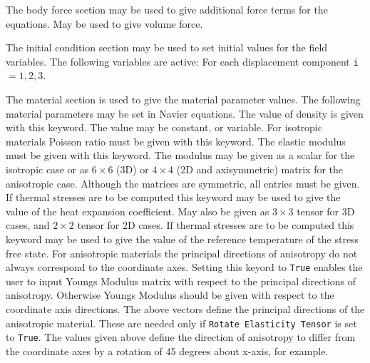 The body force section may be used to give additional force terms for the equations.
\sifbegin
{} May be used to give volume force.
\sifend

The initial condition section may be used to set initial values for the field
variables. The following variables are active:
\sifbegin
{} 
For each displacement component {\tt i}$=1,2,3$.
\sifend

The material section is used to give the material parameter values. The
following material parameters may be set in Navier equations.
\sifbegin
{}
The value of density is given with this keyword. The value may be constant,
or variable.
For isotropic materials Poisson ratio must be given with this keyword.
 The elastic modulus must be given with this
keyword. The modulus may be given as a scalar for the isotropic case or
as $6\times6$ (3D) or $4\times4$
(2D and axisymmetric) matrix for the anisotropic case. Although
the matrices are symmetric, all entries must be given.
 If thermal stresses are to be computed
this keyword may be used to give the value of the heat expansion coefficient.
May also be given as $3\times3$ tensor for 3D cases, and $2\times2$ tensor for
2D cases.
 If thermal stresses are to be computed
this keyword may be used to give the value of the reference temperature
of the stress free state.
 For anisotropic materials 
the principal directions of anisotropy do not always correspond to the
coordinate axes. Setting this keyord to {\tt True} enables the user to
input Youngs Modulus matrix with respect to the principal directions 
of anisotropy. Otherwise Youngs Modulus should be given with respect 
to the coordinate axis directions.
The above vectors define the principal directions of the anisotropic 
material. These are needed only if {\tt Rotate Elasticity Tensor} is set 
to {\tt True}. The values given above define the direction of anisotropy
to differ from the coordinate axes by a rotation of 45 degrees about 
x-axis, for example.
\sifend



